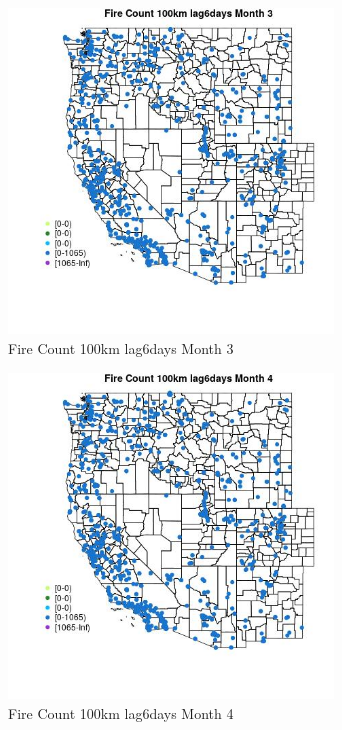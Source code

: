 \begin{figure} 
\centering  
\includegraphics[width=0.77\textwidth]{Code_Outputs/Report_ML_input_PM25_Step4_part_f_de_duplicated_aveswNAs_MapObsMo3Fire_Count_100km_lag6days.jpg} 
\caption{\label{fig:Report_ML_input_PM25_Step4_part_f_de_duplicated_aveswNAsMapObsMo3Fire_Count_100km_lag6days}Fire Count 100km lag6days Month 3} 
\end{figure} 
 

\begin{figure} 
\centering  
\includegraphics[width=0.77\textwidth]{Code_Outputs/Report_ML_input_PM25_Step4_part_f_de_duplicated_aveswNAs_MapObsMo4Fire_Count_100km_lag6days.jpg} 
\caption{\label{fig:Report_ML_input_PM25_Step4_part_f_de_duplicated_aveswNAsMapObsMo4Fire_Count_100km_lag6days}Fire Count 100km lag6days Month 4} 
\end{figure} 
 


